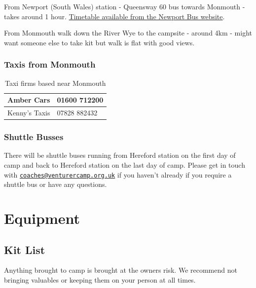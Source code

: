 \documentclass[a4paper, 11pt]{report}
\newcommand{\nl}{\newline}
\begin{document}
From Newport (South Wales) station - Queensway 60 bus towards Monmouth - takes around 1 hour. \href{https://passenger-line-assets.s3.eu-west-1.amazonaws.com/newportbus/NT0/60-timetable-20220904-f5ec1f8b.pdf}{Timetable available from the Newport Bus website}.\nl

From Monmouth walk down the River Wye to the campsite - around 4km - might want someone else to take kit but walk is flat with good views.\nl

\subsection{Taxis from Monmouth}
\begin{table}[H]
    \centering
    \begin{tabular}{p{} p{}}
        \hline
        Amber Cars & 01600 712200\\
        \hline
        Kenny's Taxis & 07828 882432\\
        \hline
    \end{tabular}
    \caption{Taxi firms based near Monmouth}
\end{table}

\subsection{Shuttle Busses}
There will be shuttle buses running from Hereford station on the first day of camp and back to Hereford station on the last day of camp. Please get in touch with \href{mailto:coaches@venturercamp.org.uk}{\texttt{coaches@venturercamp.org.uk}} if you haven't already if you require a shuttle bus or have any questions. 

\chapter{Equipment}
\section{Kit List}
Anything brought to camp is brought at the owners risk. We recommend not bringing valuables or keeping them on your person at all times.
\end{document}

